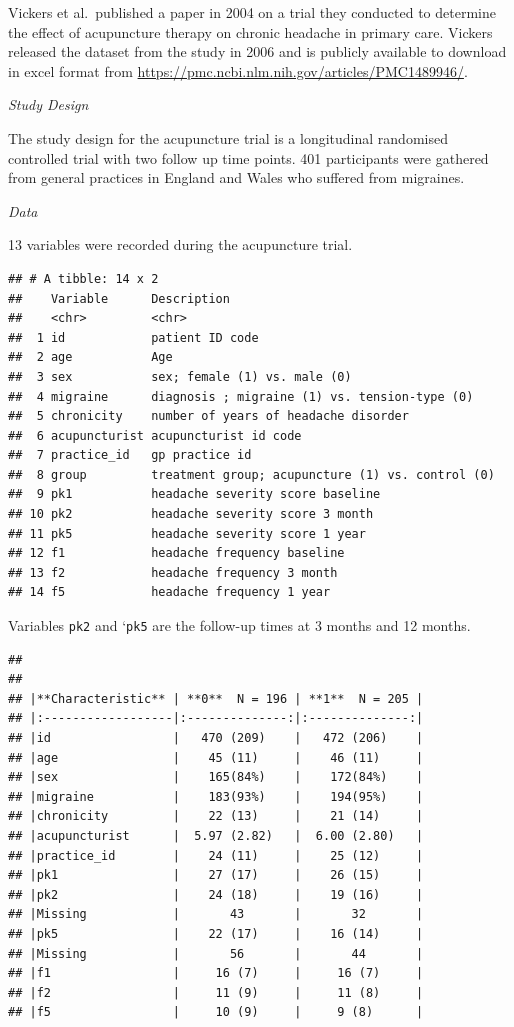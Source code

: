 \documentclass{article}
\begin{document}
Vickers et al.~published a paper in 2004 on a trial they conducted to
determine the effect of acupuncture therapy on chronic headache in
primary care. Vickers released the dataset from the study in 2006 and is
publicly available to download in excel format from
\url{https://pmc.ncbi.nlm.nih.gov/articles/PMC1489946/}.

\emph{Study Design}

The study design for the acupuncture trial is a longitudinal randomised
controlled trial with two follow up time points. 401 participants were
gathered from general practices in England and Wales who suffered from
migraines.

\emph{Data}

13 variables were recorded during the acupuncture trial.

\begin{verbatim}
## # A tibble: 14 x 2
##    Variable      Description                                     
##    <chr>         <chr>                                           
##  1 id            patient ID code                                 
##  2 age           Age                                             
##  3 sex           sex; female (1) vs. male (0)                    
##  4 migraine      diagnosis ; migraine (1) vs. tension-type (0)   
##  5 chronicity    number of years of headache disorder            
##  6 acupuncturist acupuncturist id code                           
##  7 practice_id   gp practice id                                  
##  8 group         treatment group; acupuncture (1) vs. control (0)
##  9 pk1           headache severity score baseline                
## 10 pk2           headache severity score 3 month                 
## 11 pk5           headache severity score 1 year                  
## 12 f1            headache frequency baseline                     
## 13 f2            headache frequency 3 month                      
## 14 f5            headache frequency 1 year
\end{verbatim}

Variables \texttt{pk2} and `\texttt{pk5} are the follow-up times at 3
months and 12 months.

\begin{verbatim}
## 
## 
## |**Characteristic** | **0**  N = 196 | **1**  N = 205 |
## |:------------------|:--------------:|:--------------:|
## |id                 |   470 (209)    |   472 (206)    |
## |age                |    45 (11)     |    46 (11)     |
## |sex                |    165(84%)    |    172(84%)    |
## |migraine           |    183(93%)    |    194(95%)    |
## |chronicity         |    22 (13)     |    21 (14)     |
## |acupuncturist      |  5.97 (2.82)   |  6.00 (2.80)   |
## |practice_id        |    24 (11)     |    25 (12)     |
## |pk1                |    27 (17)     |    26 (15)     |
## |pk2                |    24 (18)     |    19 (16)     |
## |Missing            |       43       |       32       |
## |pk5                |    22 (17)     |    16 (14)     |
## |Missing            |       56       |       44       |
## |f1                 |     16 (7)     |     16 (7)     |
## |f2                 |     11 (9)     |     11 (8)     |
## |f5                 |     10 (9)     |     9 (8)      |
\end{verbatim}
\end{document}
